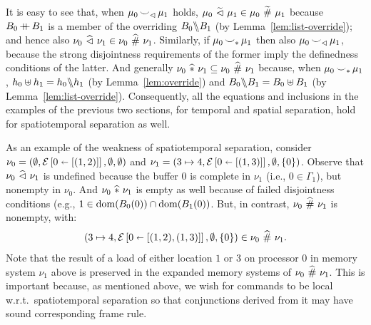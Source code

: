 \documentclass[11pt]{report}
\begin{document}
It is easy to see that, when $\mu_0 \operatorname{\smile}_\vartriangleleft \mu_1$ holds, $\mu_0 \operatorname{\,\widetilde{\vartriangleleft}\,} \mu_1 \in \mu_0 \operatorname{\,\widetilde{\#}\,} \mu_1$ because $B_0 \operatorname{+\!\!\!+} B_1$ is a member of the overriding $B_0 \backslash\!\!\backslash B_1$ (by Lemma~\ref{lem:list-override}); and hence also $\nu_0 \operatorname{\,\widehat{\vartriangleleft}\,} \nu_1 \in \nu_0 \operatorname{\,\widehat{\#}\,} \nu_1$. Similarly, if $\mu_0 \operatorname{\smile}_\ast \mu_1$ then also $\mu_0 \operatorname{\smile}_\vartriangleleft \mu_1$, because the strong disjointness requirements of the former imply the definedness conditions of the latter. And generally $\nu_0 \operatorname{\,\widehat{\ast}\,} \nu_1 \subseteq \nu_0 \operatorname{\,\widehat{\#}\,} \nu_1$ because, when $\mu_0 \operatorname{\smile}_\ast \mu_1$, $h_0 \uplus h_1 = h_0 \backslash\!\!\backslash h_1$ (by Lemma~\ref{lem:override}) and $B_0 \backslash\!\!\backslash B_1 = B_0 \uplus B_1$ (by Lemma~\ref{lem:list-override}). Consequently, all the equations and inclusions in the examples of the previous two sections, for temporal and spatial separation, hold for spatiotemporal separation as well. 

As an example of the weakness of spatiotemporal separation, consider $\nu_0 = (\operatorname{\emptyset},\mathcal{E} \left[ 0 \shortleftarrow \left[(1,2)\right] \right],\operatorname{\emptyset},\operatorname{\emptyset})$ and $\nu_1 = (3 \mapsto 4,\mathcal{E} \left[ 0 \shortleftarrow \left[(1,3)\right] \right],\operatorname{\emptyset},\left\lbrace 0 \right\rbrace)$. Observe that $\nu_0 \operatorname{\,\widehat{\vartriangleleft}\,} \nu_1$ is undefined because the buffer 0 is complete in $\nu_1$ (i.e., $0 \in \Gamma_1$), but nonempty in $\nu_0$. And $\nu_0 \operatorname{\,\widehat{\ast}\,} \nu_1$ is empty as well because of failed disjointness conditions (e.g., $1 \in \operatorname{\mathrm{dom}}(B_0(0)) \cap \operatorname{\mathrm{dom}}(B_1(0))$. But, in contrast, $\nu_0 \operatorname{\,\widehat{\#}\,} \nu_1$ is nonempty, with: \[ (3 \mapsto 4,\mathcal{E} \left[ 0 \shortleftarrow \left[(1,2),(1,3)\right] \right],\operatorname{\emptyset},\left\lbrace 0 \right\rbrace) \in \nu_0 \operatorname{\,\widehat{\#}\,} \nu_1.\] Note that the result of a load of either location $1$ or $3$ on processor 0 in memory system $\nu_1$ above is preserved in the expanded memory systems of $\nu_0 \operatorname{\,\widehat{\#}\,} \nu_1$. This is important because, as mentioned above, we wish for commands to be local w.r.t.\ spatiotemporal separation so that conjunctions derived from it may have sound corresponding frame rule. 
\end{document}
